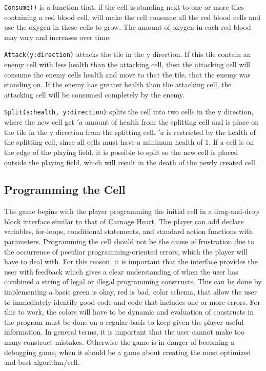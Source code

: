 \verb|Consume()| is a function that, if the cell is standing next to one or more tiles containing a red blood cell, will make the cell consume all the red blood cells and use the oxygen in these cells to grow. The amount of oxygen in each red blood may vary and increases over time.\newline

\verb|Attack(y:direction)| attacks the tile in the y direction. If this tile contain an enemy cell with less health than the attacking cell, then the attacking cell will consume the enemy cells health and move to that the tile, that the enemy was standing on. If the enemy has greater health than the attacking cell, the attacking cell will be consumed completely by the enemy.\newline

\verb|Split(a:health, y:direction)| splits the cell into two cells in the y direction, where the new cell get $'a$ amount of health from the splitting cell and is place on the tile in the y direction from the splitting cell. $'a$ is restricted by the health of the splitting cell, since all cells must have a minimum health of $1$. If a cell is on the edge of the playing field, it is possible to split so the new cell is placed outside the playing field, which will result in the death of the newly created cell.

\subsection{Programming the Cell}

The game begins with the player programming the initial cell in a drag-and-drop block interface similar to that of Carnage Heart.
The player can add declare variables, for-loops, conditional statements, and standard action functions with parameters.
Programming the cell should not be the cause of frustration due to the occurrence of peculiar programming-oriented errors, which the player will have to deal with.
For this reason, it is important that the interface provides the user with feedback which gives a clear understanding of when the user has combined a string of legal or illegal programming constructs.
This can be done by implementing a basic green is okay, red is bad, color schema, that allow the user to immediately identify good code and code that includes one or more errors.
For this to work, the colors will have to be dynamic and evaluation of constructs in the program must be done on a regular basis to keep given the player useful information. 
In general terms, it is important that the user cannot make too many construct mistakes.
Otherwise the game is in danger of becoming a debugging game, when it should be a game about creating the most optimized and best algorithm/cell.

